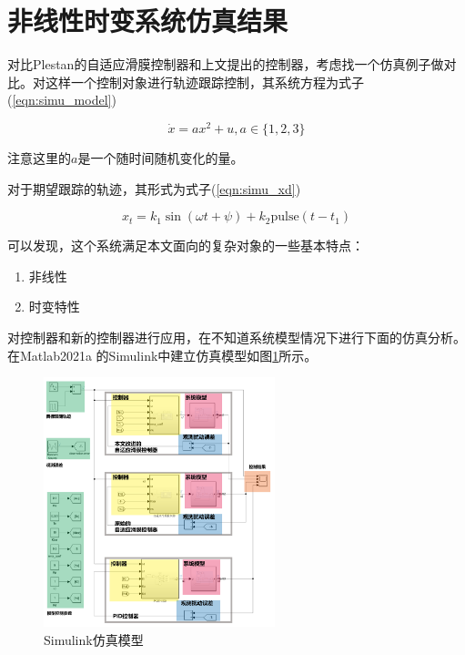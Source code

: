 \section{非线性时变系统仿真结果}

对比Plestan的自适应滑膜控制器和上文提出的控制器，考虑找一个仿真例子做对比。对这样一个控制对象进行轨迹跟踪控制，其系统方程为式子(\ref{eqn:simu_model})

\begin{equation}
    \dot{x}=ax^2+u, a\in \{1,2,3\}
    \label{eqn:simu_model}
\end{equation}

注意这里的$a$是一个随时间随机变化的量。

对于期望跟踪的轨迹，其形式为式子(\ref{eqn:simu_xd})

\begin{equation}
    x_t=k_1\sin \left( \omega t+\psi \right) +k_2\mathrm{pulse}\left( t-t_1 \right) 
    \label{eqn:simu_xd}
\end{equation}

可以发现，这个系统满足本文面向的复杂对象的一些基本特点：
\begin{enumerate}
    \item 非线性
    \item 时变特性
\end{enumerate}

对控制器和新的控制器进行应用，在不知道系统模型情况下进行下面的仿真分析。在Matlab2021a
的Simulink中建立仿真模型如图\ref{fig:simu_model}所示。

\begin{figure}[H]
    \centering
    \includegraphics[width=0.6\textwidth]{imgs/simu_model.png}
    \caption{Simulink仿真模型}
    \label{fig:simu_model}
\end{figure}


